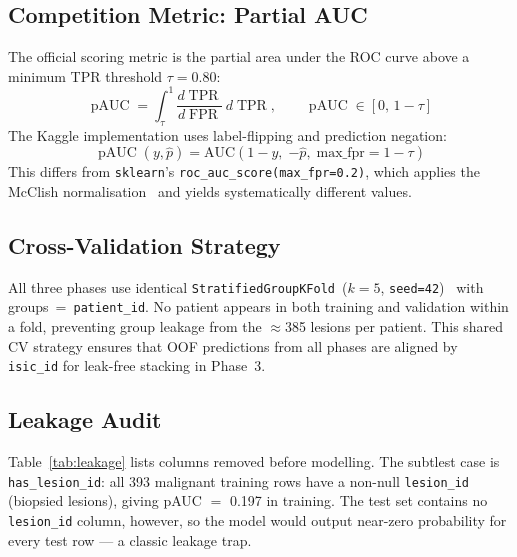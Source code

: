 \documentclass[conference]{IEEEtran}
\newcommand{\pauc}{\operatorname{pAUC}}
\newcommand{\tpr}{\operatorname{TPR}}
\newcommand{\fpr}{\operatorname{FPR}}
\begin{document}
\subsection{Competition Metric: Partial AUC}

The official scoring metric is the partial area under the ROC curve
above a minimum TPR threshold $\tau = 0.80$:
\begin{equation}
  \pauc = \int_{\tau}^{1}
  \frac{d\tpr}{d\fpr}\,d\tpr, \qquad \pauc \in [0,\,1-\tau]
  \label{eq:pauc}
\end{equation}
The Kaggle implementation uses label-flipping and prediction negation:
\begin{equation}
  \pauc(y, \hat{p}) = \text{AUC}\!\left(
    1-y,\;{-\hat{p}},\;\text{max\_fpr} = 1-\tau
  \right)
  \label{eq:pauc_flip}
\end{equation}
This differs from \texttt{sklearn}'s \texttt{roc\_auc\_score(max\_fpr=0.2)},
which applies the McClish normalisation~\cite{mcclish1989} and yields
systematically different values.

\subsection{Cross-Validation Strategy}

All three phases use identical \texttt{StratifiedGroupKFold}~($k{=}5$,
\texttt{seed=42})~\cite{sklearn} with groups~=~\texttt{patient\_id}.
No patient appears in both training and validation within a fold,
preventing group leakage from the $\approx$385 lesions per patient.
This shared CV strategy ensures that OOF predictions from all phases
are aligned by \texttt{isic\_id} for leak-free stacking in Phase~3.

\subsection{Leakage Audit}

Table~\ref{tab:leakage} lists columns removed before modelling.
The subtlest case is \texttt{has\_lesion\_id}: all 393 malignant
training rows have a non-null \texttt{lesion\_id} (biopsied
lesions), giving pAUC $=$ 0.197 in training.
The test set contains no \texttt{lesion\_id} column, however, so
the model would output near-zero probability for every test row ---
a classic leakage trap.
\end{document}
